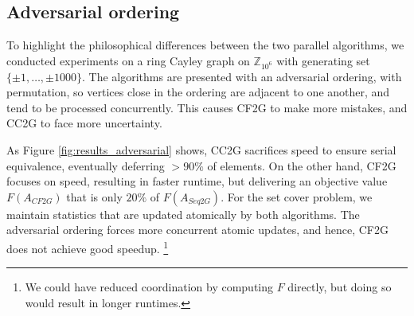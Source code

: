\documentclass{article} %
\newcommand{\hogwild}{CF2G}
\newcommand{\occ}{CC2G}
\begin{document}
\subsection{Adversarial ordering}

To highlight the philosophical differences between the two parallel algorithms, we conducted experiments on a ring Cayley graph on $\mathbb{Z}_{10^6}$ with generating set $\{\pm 1,\dots, \pm 1000\}$.
The algorithms are presented with an adversarial ordering, with permutation, so vertices close in the ordering are adjacent to one another, and tend to be processed concurrently.
This causes \hogwild{} to make more mistakes, and \occ{} to face more uncertainty.

As Figure \ref{fig:results_adversarial} shows, \occ{}  sacrifices speed to ensure serial equivalence, eventually deferring $>90\%$ of elements.
On the other hand, \hogwild{} focuses on speed, resulting in faster runtime, but delivering an objective value $F(A_{\hogwild{}})$ that is only $20\%$ of $F(A_{Seq2G})$.
For the set cover problem, we maintain statistics that are updated atomically by both algorithms.
The adversarial ordering forces more concurrent atomic updates, and hence, \hogwild{} does not achieve good speedup.
\footnote{We could have reduced coordination by computing $F$ directly, but doing so would result in longer runtimes.}
\end{document}
